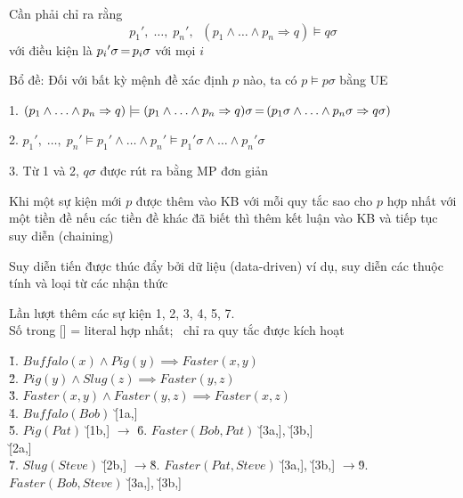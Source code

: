 \documentclass[fleqn]{article}
\begin{document}
\begin{huge}

Cần phải chỉ ra rằng 
\[{p_1}', \; \ldots, \; {p_n}', \;\;
( p_1 \land \ldots \land p_n \Rightarrow q) \models q\sigma\]
với điều kiện là ${p_i}'\sigma {\,{=}\,} p_i\sigma$ với mọi $i$

Bổ đề: Đối với bất kỳ mệnh đề xác định $p$ nào, ta có $p \models p\sigma$ bằng UE

1. $( p_1 \land \ldots \land p_n \Rightarrow q) \models 
    ( p_1 \land \ldots \land p_n \Rightarrow q)\sigma {\,{=}\,}
    ( p_1\sigma \land \ldots \land p_n\sigma \Rightarrow q\sigma)$

2. $ {p_1}', \; \ldots, \; {p_n}' \models
     {p_1}' \land \ldots \land {p_n}' \models
     {p_1}'\sigma \land \ldots \land {p_n}'\sigma $

3. Từ 1 và 2, $q\sigma$ được rút ra bằng MP đơn giản




Khi một sự kiện mới $p$ được thêm vào KB\al
   với mỗi quy tắc sao cho $p$ hợp nhất với một tiền đề\nl
      nếu các tiền đề khác \u{đã biết}\nl
      thì thêm kết luận vào KB và tiếp tục suy diễn (chaining)

Suy diễn tiến \u{được thúc đẩy bởi dữ liệu (data-driven)}\nl
ví dụ, suy diễn các thuộc tính và loại từ các nhận thức



Lần lượt thêm các sự kiện 1, 2, 3, 4, 5, 7.\\
Số trong [] = literal hợp nhất; \tick\ chỉ ra quy tắc được kích hoạt

\u{1.} $Buffalo(x) \land Pig(y) \implies Faster(x,y)$\\
\u{2.} $Pig(y) \land Slug(z) \implies Faster(y,z)$\\
\u{3.} $Faster(x,y) \land Faster(y,z) \implies Faster(x,z)$\\
\u{4.} $Buffalo(Bob)$ \u{[1a,\cross]}\\
\u{5.} $Pig(Pat)$ \u{[1b,\tick]} $\rightarrow$ \u{6.} $Faster(Bob,Pat)$ \u{[3a,\cross]}, \u{[3b,\cross]}\\
 \u{[2a,\cross]}\\
\u{7.} $Slug(Steve)$ \u{[2b,\tick]}\al
$\rightarrow$\u{8.} $Faster(Pat,Steve)$ \u{[3a,\cross]}, \u{[3b,\tick]}\nl
$\rightarrow$\u{9.} $Faster(Bob,Steve)$ \u{[3a,\cross]}, \u{[3b,\cross]}



\end{huge}
\end{document}
